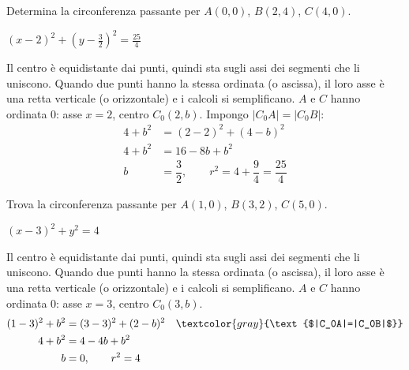 \begin{question}[ID=2.14, subtitle={Circonferenza per $A(0,0)$, $B(2,4)$, $C(4,0)$}, difficulty=difficile, tags={circonferenza}]
Determina la circonferenza passante per $A(0,0)$, $B(2,4)$, $C(4,0)$.
\begin{solution}
$(x-2)^2+\left(y-\tfrac32\right)^2=\tfrac{25}{4}$
\end{solution}
\begin{explanation}
Il centro è equidistante dai punti, quindi sta sugli assi dei segmenti che li uniscono. Quando due punti hanno la stessa ordinata (o ascissa), il loro asse è una retta verticale (o orizzontale) e i calcoli si semplificano.
$A$ e $C$ hanno ordinata $0$: asse $x=2$, centro $C_0(2,b)$. Impongo $|C_0A|=|C_0B|$:
\[\begin{aligned}
4+b^2 &= (2-2)^2+(4-b)^2\\
4+b^2 &= 16-8b+b^2\\
b &= \dfrac32, \qquad r^2=4+\dfrac94=\dfrac{25}{4}
\end{aligned}\]
\end{explanation}
\end{question}


\begin{question}[ID=2.15, subtitle={Circonferenza per $A(1,0)$, $B(3,2)$, $C(5,0)$}, difficulty=difficile, tags={circonferenza}]
Trova la circonferenza passante per $A(1,0)$, $B(3,2)$, $C(5,0)$.
\begin{solution}
$(x-3)^2+y^2=4$
\end{solution}
\begin{explanation}
Il centro è equidistante dai punti, quindi sta sugli assi dei segmenti che li uniscono. Quando due punti hanno la stessa ordinata (o ascissa), il loro asse è una retta verticale (o orizzontale) e i calcoli si semplificano.
$A$ e $C$ hanno ordinata $0$: asse $x=3$, centro $C_0(3,b)$.
\[\begin{aligned}
(1-3)^2+b^2 &= (3-3)^2+(2-b)^2 && \textcolor{gray}{\text{$|C_0A|=|C_0B|$}}\\
4+b^2 &= 4-4b+b^2\\
b &= 0, \qquad r^2=4
\end{aligned}\]
\end{explanation}
\end{question}


